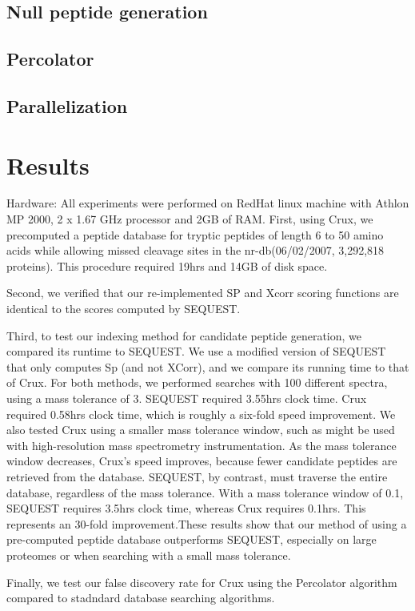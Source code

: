 \documentclass{bioinfo}
\begin{document}
\subsection*{Null peptide generation}
\subsection*{Percolator}
\subsection*{Parallelization}

\section{Results}

Hardware: All experiments were performed on RedHat linux machine with Athlon MP 2000, 2 x 1.67 GHz processor and 2GB of RAM.
First, using Crux, we precomputed a peptide database for tryptic
peptides of length 6 to 50 amino acids while allowing missed cleavage sites in the nr-db(06/02/2007, 3,292,818 proteins). This procedure required 19hrs and 14GB of disk space.

Second, we verified that our re-implemented SP and Xcorr scoring functions are identical to the
scores computed by SEQUEST. 

Third, to test our indexing method for candidate peptide generation, we compared its runtime to SEQUEST.  
We use a modified version of SEQUEST that only computes Sp (and not XCorr),
and we compare its running time to that of Crux.  For both methods, we
performed searches with 100 different spectra, using a mass tolerance
of 3.  SEQUEST required 3.55hrs clock time. Crux required 0.58hrs clock time, 
which is roughly a six-fold speed improvement. We also tested Crux using a smaller mass tolerance window, such
as might be used with high-resolution mass spectrometry
instrumentation.  As the mass tolerance window decreases, Crux's speed
improves, because fewer candidate peptides are retrieved from the
database.  SEQUEST, by contrast, must traverse the entire database,
regardless of the mass tolerance.  With a mass tolerance window of
0.1, SEQUEST requires 3.5hrs clock time, whereas Crux requires 
0.1hrs.  This represents an 30-fold improvement.These results show that our method of using a pre-computed peptide
database outperforms SEQUEST, especially on large proteomes or when
searching with a small mass tolerance.

Finally, we test our false discovery rate for Crux using the Percolator algorithm compared to stadndard database searching algorithms.
\end{document}
